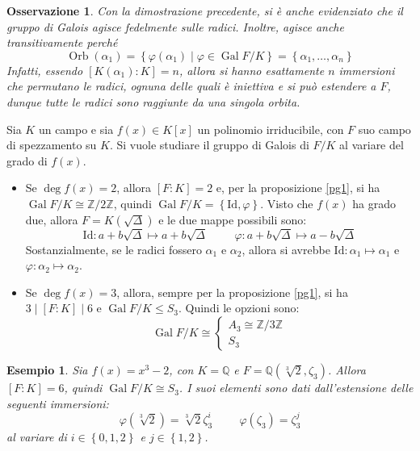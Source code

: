 \documentclass[12pt]{scrartcl}
\theoremstyle{style}
\newtheorem{esempio}{Esempio}[section]
\newtheorem{osservazione}{Osservazione}[section]
\numberwithin{equation}{subsection}
\begin{document}
\begin{osservazione}
Con la dimostrazione precedente, si \`e anche evidenziato che il gruppo di Galois agisce fedelmente sulle radici.
Inoltre, agisce anche transitivamente perch\'e
\[
\operatorname{Orb} (\alpha _1) = \left\{ \varphi (\alpha _1)  \mid \varphi \in \operatorname{Gal} F / K \right\} = \left\{ \alpha _1,\ldots, \alpha _n \right\} 
\] 
Infatti, essendo $[K(\alpha _1) : K] = n$, allora si hanno esattamente $n$ immersioni che permutano le radici, ognuna delle quali \`e iniettiva e si pu\`o estendere a $F$, dunque tutte le radici sono raggiunte da una singola orbita.
\end{osservazione}
\noindent Sia $K$ un campo e sia $f(x) \in K[x]$ un polinomio irriducibile, con $F$ suo campo di spezzamento su $K$.
Si vuole studiare il gruppo di Galois di $F / K$ al variare del grado di $f(x)$.
\begin{itemize}
	\item Se $\deg f(x) = 2$, allora $[F:K]=2$ e, per la proposizione \ref{pg1}, si ha $\operatorname{Gal} F / K \cong \mathbb{Z}/2\mathbb{Z}$, quindi $\operatorname{Gal}F / K = \left\{ \mathrm{Id} , \varphi  \right\}  $.
		Visto che $f(x)$ ha grado due, allora $F = K(\sqrt{\Delta } )$ e le due mappe possibili sono:
		\[
		\mathrm{Id} :a + b \sqrt{\Delta } \longmapsto a + b\sqrt{\Delta }  \hspace{1cm} \varphi : a + b\sqrt{\Delta } \longmapsto a - b\sqrt{\Delta } 
		\] 
		Sostanzialmente, se le radici fossero $\alpha _1$ e $\alpha _2$, allora si avrebbe $\mathrm{Id} :\alpha _1 \longmapsto \alpha _1$ e $\varphi : \alpha _2 \longmapsto \alpha _2$.
	\item Se $\deg f(x) =3$, allora, sempre per la proposizione \ref{pg1}, si ha $3  \mid [F:K] \mid 6$ e $\operatorname{Gal} F / K \le S_3$.
		Quindi le opzioni sono:
		\[
		\operatorname{Gal} F / K \cong \begin{cases}
			A_3 \cong \mathbb{Z}/3\mathbb{Z}\\
			S_3
		\end{cases}
		\] 
\end{itemize}
\begin{esempio}
	Sia $f(x) = x^3 -2 $, con $K = \mathbb{Q}$ e $F = \mathbb{Q}(\sqrt[3]{2} , \zeta_3)$.
	Allora $[F:K] = 6$, quindi $\operatorname{Gal} F / K \cong S_3$.
	I suoi elementi sono dati dall'estensione delle seguenti immersioni:
	\[
		\varphi (\sqrt[3]{2} ) =\sqrt[3]{2} \zeta_3^i \hspace{1cm} \varphi (\zeta_3) = \zeta_3^j
	\] 
	al variare di $i \in \left\{ 0,1,2 \right\} $ e $j \in \left\{ 1,2 \right\} $.
\end{esempio}
\end{document}
